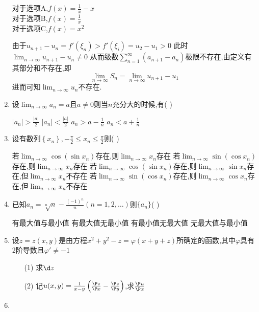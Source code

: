 \documentclass[12pt, a4paper, oneside, UTF8]{ctexbook}
\begin{document}
\begin{enumerate}
{        \begin{solution}[选择题不客气]
            对于选项A,$f(x)=\frac{1}{x}-x$ \\
            对于选项B,$f(x)=\frac{1}{x}$ \\
            对于选项C,$f(x)=x^2$ 
        \end{solution}

        \begin{solution}[级数]
            由于$u_{n+1}-u_n=f'(\xi_n) > f'(\xi_i) = u_2 - u_1 > 0$ 此时$\lim_{n\to\infty}u_{n+1}-u_n \neq 0$ 
            从而级数$\sum_{n=1}^{\infty}\left(a_{n+1}-a_n\right)$极限不存在,由定义有其部分和不存在,即
            $$
            \lim_{n\to\infty}S_n = \lim_{n\to\infty} u_{n+1} - u_1 
            $$
            进而可知$\lim_{n\to\infty}u_n$不存在.
        \end{solution}
    }
    \item  设$\lim_{n\to\infty}a_n=a$且$a\neq 0$则当$n$充分大的时候,有(   )
    \begin{choices}
        \task $\left|a_n\right|>\frac{\left|a\right|}{2}$
        \task $\left|a_n\right|<\frac{\left|a\right|}{2}$
        \task $a_n>a-\frac{1}{n}$
        \task $a_n<a+\frac{1}{n}$
    \end{choices}

    \item 设有数列$\left\{x_n\right\},-\frac{\pi}{2}\leq x_n\leq \frac{\pi}{2}$则(    )
    \begin{choices}[1]
        \task 若$\lim_{n\to\infty}\cos{(\sin{x_n})}$存在,则$\lim_{n\to\infty}x_n$存在
        \task 若$\lim_{n\to\infty}\sin{(\cos{x_n})}$存在,则$\lim_{n\to\infty}x_n$存在
        \task 若$\lim_{n\to\infty}\cos{(\sin{x_n})}$存在,则$\lim_{n\to\infty}\sin{x_n}$存在,但$\lim_{n\to\infty}x_n$不存在
        \task 若$\lim_{n\to\infty}\sin{(\cos{x_n})}$存在,则$\lim_{n\to\infty}\cos{x_n}$存在,但$\lim_{n\to\infty}x_n$不存在
    \end{choices}


    \item 已知$a_n=\sqrt[n]{n}-\frac{(-1)^n}{n}(n=1,2,\ldots)$则$\{a_n\}$(    )
    \begin{choices}[2]
        \task 有最大值与最小值
        \task 有最大值无最小值
        \task 有最小值无最大值
        \task 无最大值与最小值
    \end{choices}

    \item \bl[2] 设$z=z(x,y)$是由方程$x^2+y^2-z=\varphi(x+y+z)$所确定的函数,其中$\varphi$具有2阶导数且$\varphi'\neq -1$ 
    \begin{enumerate}
        \item [(1)] 求$\d z$ 
        \item [(2)] 记$ u(x,y)=\frac{1}{x-y}\left(\frac{\P z}{\P x} - \frac{\P z}{\P y}\right)$,求$\frac{\P u}{\P x}$
    \end{enumerate}

    \item 

\end{enumerate}
\end{document}
